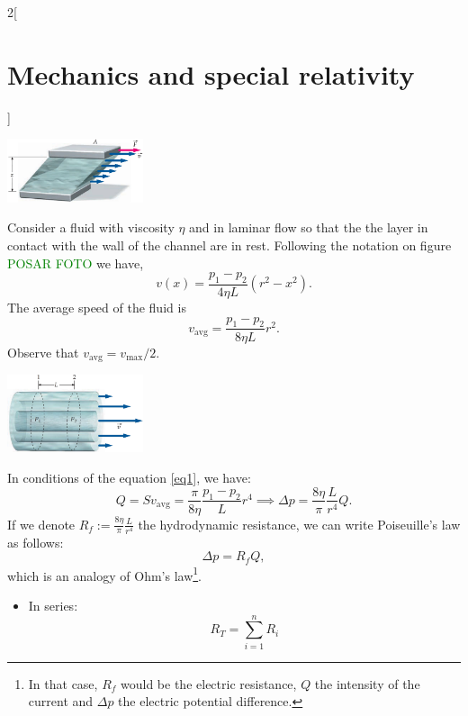 \documentclass[../../../main.tex]{subfiles}
\begin{document}
\begin{multicols}{2}[\section{Mechanics and special relativity}]
\begin{concept}[Viscosity]
\end{concept}
\begin{minipage}{\linewidth}
    \centering
    \includegraphics[width=4cm]{Physics/1st/Mechanics_and_special_relativity/Images/vis.jpg}
\end{minipage}
\begin{concept}
Consider a fluid with viscosity $\eta$ and in laminar flow so that the the layer in contact with the wall of the channel are in rest. Following the notation on figure \textcolor{green}{POSAR FOTO} we have,
$$v(x)=\frac{p_1-p_2}{4\eta L}(r^2-x^2).$$ The average speed of the fluid is 
\begin{equation}
    v_\text{avg}=\frac{p_1-p_2}{8\eta L}r^2.
    \label{eq1}
\end{equation} Observe that $v_\text{avg}=v_\text{max}/2$.
\end{concept}
\begin{minipage}{\linewidth}
    \centering
    \includegraphics[width=4cm]{Physics/1st/Mechanics_and_special_relativity/Images/vis2.jpg}
\end{minipage}
\begin{concept}
In conditions of the equation \eqref{eq1}, we have: $$Q=Sv_\text{avg}=\frac{\pi}{8\eta }\frac{p_1-p_2}{L}r^4\implies\Delta p=\frac{8\eta}{\pi}\frac{L}{r^4}Q.$$ If we denote $\displaystyle R_f:=\frac{8\eta}{\pi}\frac{L}{r^4}$ the hydrodynamic resistance, we can write Poiseuille's law as follows: $$\Delta p=R_f Q,$$ which is an analogy of Ohm's law\footnote{In that case, $R_f$ would be the electric resistance, $Q$ the intensity of the current and $\Delta p$ the electric potential difference.}.
\end{concept}
\begin{concept}
\hfill\begin{itemize}
    \item In series: $$R_T=\sum_{i=1}^nR_i$$

\end{itemize}
\end{concept}
\end{multicols}
\end{document}
